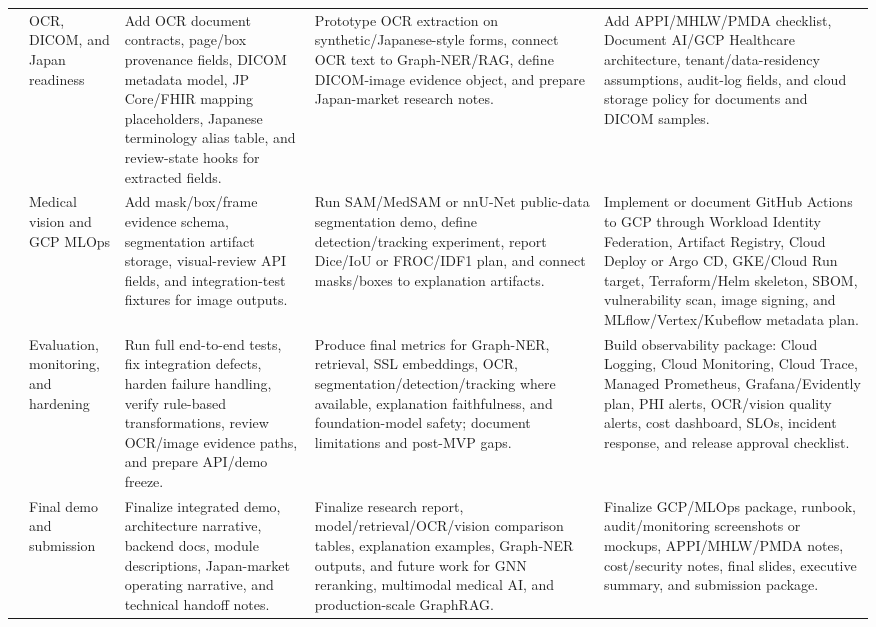 {\begin{longtable}{p{}p{}p{}p{}p{}}
\addlinespace
9 & OCR, DICOM, and Japan readiness & Add OCR document contracts, page/box provenance fields, DICOM metadata model, JP Core/FHIR mapping placeholders, Japanese terminology alias table, and review-state hooks for extracted fields. & Prototype OCR extraction on synthetic/Japanese-style forms, connect OCR text to Graph-NER/RAG, define DICOM-image evidence object, and prepare Japan-market research notes. & Add APPI/MHLW/PMDA checklist, Document AI/GCP Healthcare architecture, tenant/data-residency assumptions, audit-log fields, and cloud storage policy for documents and DICOM samples. \\
\addlinespace
10 & Medical vision and GCP MLOps & Add mask/box/frame evidence schema, segmentation artifact storage, visual-review API fields, and integration-test fixtures for image outputs. & Run SAM/MedSAM or nnU-Net public-data segmentation demo, define detection/tracking experiment, report Dice/IoU or FROC/IDF1 plan, and connect masks/boxes to explanation artifacts. & Implement or document GitHub Actions to GCP through Workload Identity Federation, Artifact Registry, Cloud Deploy or Argo CD, GKE/Cloud Run target, Terraform/Helm skeleton, SBOM, vulnerability scan, image signing, and MLflow/Vertex/Kubeflow metadata plan. \\
\addlinespace
11 & Evaluation, monitoring, and hardening & Run full end-to-end tests, fix integration defects, harden failure handling, verify rule-based transformations, review OCR/image evidence paths, and prepare API/demo freeze. & Produce final metrics for Graph-NER, retrieval, SSL embeddings, OCR, segmentation/detection/tracking where available, explanation faithfulness, and foundation-model safety; document limitations and post-MVP gaps. & Build observability package: Cloud Logging, Cloud Monitoring, Cloud Trace, Managed Prometheus, Grafana/Evidently plan, PHI alerts, OCR/vision quality alerts, cost dashboard, SLOs, incident response, and release approval checklist. \\
\addlinespace
12 & Final demo and submission & Finalize integrated demo, architecture narrative, backend docs, module descriptions, Japan-market operating narrative, and technical handoff notes. & Finalize research report, model/retrieval/OCR/vision comparison tables, explanation examples, Graph-NER outputs, and future work for GNN reranking, multimodal medical AI, and production-scale GraphRAG. & Finalize GCP/MLOps package, runbook, audit/monitoring screenshots or mockups, APPI/MHLW/PMDA notes, cost/security notes, final slides, executive summary, and submission package. \\
\bottomrule
\end{longtable}
}

